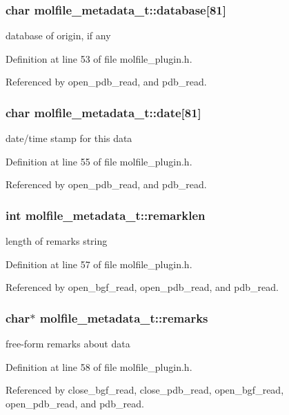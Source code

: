 \subsubsection{\setlength{\rightskip}{0pt plus 5cm}char molfile\_\-metadata\_\-t::database[81]}\label{structmolfile__metadata__t_m0}


database of origin, if any 

Definition at line 53 of file molfile\_\-plugin.h.

Referenced by open\_\-pdb\_\-read, and pdb\_\-read.
\subsubsection{\setlength{\rightskip}{0pt plus 5cm}char molfile\_\-metadata\_\-t::date[81]}\label{structmolfile__metadata__t_m2}


date/time stamp for this data 

Definition at line 55 of file molfile\_\-plugin.h.

Referenced by open\_\-pdb\_\-read, and pdb\_\-read.
\subsubsection{\setlength{\rightskip}{0pt plus 5cm}int molfile\_\-metadata\_\-t::remarklen}\label{structmolfile__metadata__t_m4}


length of remarks string 

Definition at line 57 of file molfile\_\-plugin.h.

Referenced by open\_\-bgf\_\-read, open\_\-pdb\_\-read, and pdb\_\-read.
\subsubsection{\setlength{\rightskip}{0pt plus 5cm}char$\ast$ molfile\_\-metadata\_\-t::remarks}\label{structmolfile__metadata__t_m5}


free-form remarks about data 

Definition at line 58 of file molfile\_\-plugin.h.

Referenced by close\_\-bgf\_\-read, close\_\-pdb\_\-read, open\_\-bgf\_\-read, open\_\-pdb\_\-read, and pdb\_\-read.
